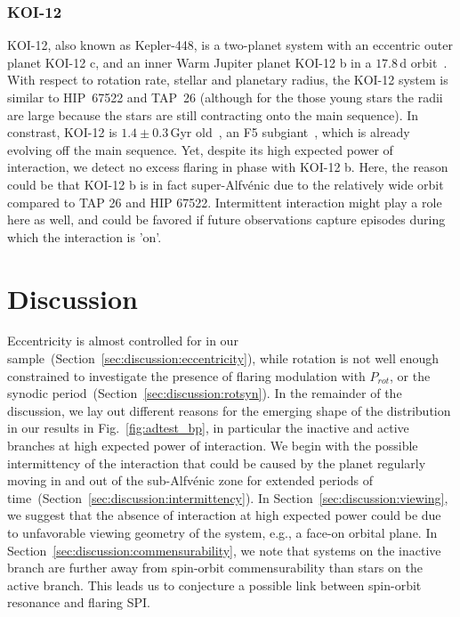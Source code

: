 \documentclass[twocolumn]{aastex631}
\begin{document}
\subsubsection{KOI-12}
\label{sec:results:individualstars:koi12}
KOI-12, also known as Kepler-448, is a two-planet system with an eccentric outer planet KOI-12 c, and an inner Warm Jupiter planet KOI-12 b in a $17.8\,$d orbit~\citep{masuda2017eccentric}. With respect to rotation rate, stellar and planetary radius, the KOI-12 system is similar to HIP~67522 and TAP~26 (although for the those young stars the radii are large because the stars are still contracting onto the main sequence). In constrast, KOI-12 is $1.4\pm0.3\,$Gyr old~\citep{bourrier2015sophie}, an F5 subgiant~\citep{frasca2016activity}, which is already evolving off the main sequence. Yet, despite its high expected power of interaction, we detect no excess flaring in phase with KOI-12 b. Here, the reason could be that KOI-12 b is in fact super-Alfv\'enic due to the relatively wide orbit compared to TAP 26 and HIP 67522. Intermittent interaction might play a role here as well, and could be favored if future observations capture episodes during which the interaction is 'on'.





\section{Discussion}
\label{sec:discussion}
Eccentricity is almost controlled for in our sample~(Section~\ref{sec:discussion:eccentricity}), while rotation is not well enough constrained to investigate the presence of flaring modulation with $P_{rot}$, or the synodic period~(Section~\ref{sec:discussion:rotsyn}). In the remainder of the discussion, we lay out different reasons for the emerging shape of the distribution in our results in Fig.~\ref{fig:adtest_bp}, in particular the inactive and active branches at high expected power of interaction. We begin with the possible intermittency of the interaction that could be caused by the planet regularly moving in and out of the sub-Alfv\'enic zone for extended periods of time~(Section~\ref{sec:discussion:intermittency}). In Section~\ref{sec:discussion:viewing}, we suggest that the absence of interaction at high expected power could be due to unfavorable viewing geometry of the system, e.g., a face-on orbital plane. In Section~\ref{sec:discussion:commensurability}, we note that systems on the inactive branch are further away from spin-orbit commensurability than stars on the active branch. This leads us to conjecture a possible link between spin-orbit resonance and flaring SPI.
\end{document}
